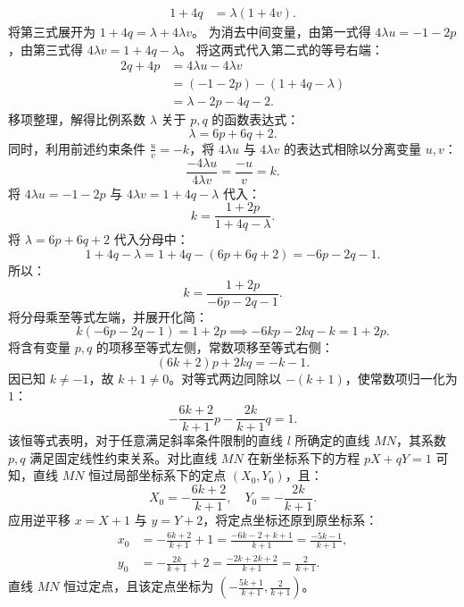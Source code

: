 \begin{solution}
\begin{align*}
1+4q &= \lambda(1+4v).
\end{align*}
将第三式展开为 $1+4q = \lambda + 4\lambda v$。
为消去中间变量，由第一式得 $4\lambda u = -1-2p$，由第三式得 $4\lambda v = 1+4q-\lambda$。
将这两式代入第二式的等号右端：
\begin{align*}
2q+4p &= 4\lambda u - 4\lambda v \\
&= (-1-2p) - (1+4q-\lambda) \\
&= \lambda - 2p - 4q - 2.
\end{align*}
移项整理，解得比例系数 $\lambda$ 关于 $p, q$ 的函数表达式：
\[ \lambda = 6p + 6q + 2. \]
同时，利用前述约束条件 $\frac{u}{v} = -k$，将 $4\lambda u$ 与 $4\lambda v$ 的表达式相除以分离变量 $u, v$：
\[ \frac{-4\lambda u}{4\lambda v} = \frac{-u}{v} = k. \]
将 $4\lambda u = -1-2p$ 与 $4\lambda v = 1+4q-\lambda$ 代入：
\[ k = \frac{1+2p}{1+4q-\lambda}. \]
将 $\lambda = 6p + 6q + 2$ 代入分母中：
\[ 1+4q-\lambda = 1+4q - (6p+6q+2) = -6p - 2q - 1. \]
所以：
\[ k = \frac{1+2p}{-6p - 2q - 1}. \]
将分母乘至等式左端，并展开化简：
\[ k(-6p - 2q - 1) = 1+2p \implies -6kp - 2kq - k = 1+2p. \]
将含有变量 $p, q$ 的项移至等式左侧，常数项移至等式右侧：
\[ (6k+2)p + 2kq = -k - 1. \]
因已知 $k \neq -1$，故 $k+1 \neq 0$。对等式两边同除以 $-(k+1)$，使常数项归一化为 $1$：
\[ -\frac{6k+2}{k+1} p - \frac{2k}{k+1} q = 1. \]
该恒等式表明，对于任意满足斜率条件限制的直线 $l$ 所确定的直线 $MN$，其系数 $p, q$ 满足固定线性约束关系。对比直线 $MN$ 在新坐标系下的方程 $pX + qY = 1$ 可知，直线 $MN$ 恒过局部坐标系下的定点 $(X_0, Y_0)$，且：
\[ X_0 = -\frac{6k+2}{k+1}, \quad Y_0 = -\frac{2k}{k+1}. \]
应用逆平移 $x = X + 1$ 与 $y = Y + 2$，将定点坐标还原到原坐标系：
\begin{align*}
x_0 &= -\frac{6k+2}{k+1} + 1 = \frac{-6k-2 + k+1}{k+1} = \frac{-5k-1}{k+1}, \\
y_0 &= -\frac{2k}{k+1} + 2 = \frac{-2k + 2k+2}{k+1} = \frac{2}{k+1}.
\end{align*}
直线 $MN$ 恒过定点，且该定点坐标为 $\left( -\frac{5k+1}{k+1}, \frac{2}{k+1} \right)$。
\end{solution}


